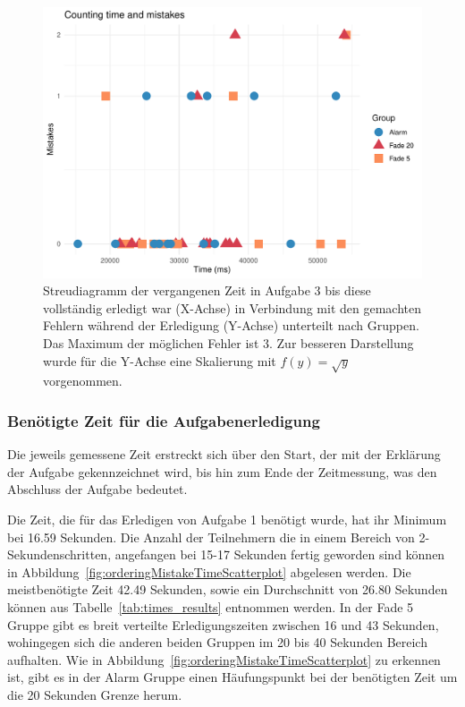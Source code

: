 \begin{figure}[H]
	\centering
	\includegraphics[width=\textwidth]{./_StudyResults/countingMisTimeScat}
	\caption{Streudiagramm der vergangenen Zeit in Aufgabe 3 bis diese vollständig erledigt war (X-Achse) in Verbindung mit den gemachten Fehlern während der Erledigung (Y-Achse) unterteilt nach Gruppen. Das Maximum der möglichen Fehler ist 3. Zur besseren Darstellung wurde für die Y-Achse eine Skalierung mit $f(y) = \sqrt{y}$ vorgenommen.}
	\label{fig:countingMistakeTimeScatterplot}
\end{figure}

\subsubsection{Benötigte Zeit für die Aufgabenerledigung}

Die jeweils gemessene Zeit erstreckt sich über den Start, der mit der Erklärung der Aufgabe gekennzeichnet wird, bis hin zum Ende der Zeitmessung, was den Abschluss der Aufgabe bedeutet.

Die Zeit, die für das Erledigen von Aufgabe 1 benötigt wurde, hat ihr Minimum bei 16.59 Sekunden. Die Anzahl der Teilnehmern die in einem Bereich von 2-Sekundenschritten, angefangen bei 15-17 Sekunden fertig geworden sind können in Abbildung~\ref{fig:orderingMistakeTimeScatterplot} abgelesen werden. Die meistbenötigte Zeit 42.49 Sekunden, sowie ein Durchschnitt von 26.80 Sekunden können aus Tabelle~\ref{tab:times_results} entnommen werden.
In der Fade 5 Gruppe gibt es breit verteilte Erledigungszeiten zwischen 16 und 43 Sekunden, wohingegen sich die anderen beiden Gruppen im 20 bis 40 Sekunden Bereich aufhalten. Wie in Abbildung~\ref{fig:orderingMistakeTimeScatterplot} zu erkennen ist, gibt es in der Alarm Gruppe einen Häufungspunkt bei der benötigten Zeit um die 20 Sekunden Grenze herum.

